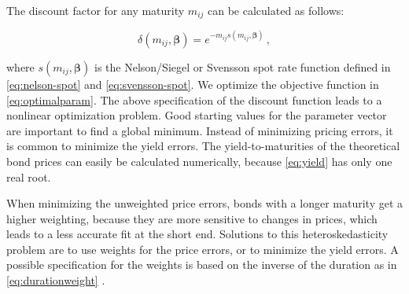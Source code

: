 The discount factor for any maturity $m_{ij}$ can be calculated as follows:

\begin{displaymath}
\delta(m_{ij}, \bm{\beta})=e^{-m_{ij}s(m_{ij},\bm{\beta})}\,,
\end{displaymath}

where $s(m_{ij},\bm{\beta})$ is the Nelson/Siegel or Svensson spot rate function defined in \eqref{eq:nelson-spot} and \eqref{eq:svensson-spot}. We optimize the objective function in \eqref{eq:optimalparam}. The above specification of the discount function leads to a nonlinear optimization problem. Good starting values for the parameter vector are important to find a global minimum. Instead of minimizing pricing errors, it is common to minimize the yield errors. The yield-to-maturities of the theoretical bond prices can easily be calculated numerically, because \eqref{eq:yield} has only one real root. 

When minimizing the unweighted price errors, bonds with a longer maturity get a higher weighting, because they are more sensitive to changes in prices, which leads to a less accurate fit at the short end. Solutions to this heteroskedasticity problem are to use weights for the price errors, or to minimize the yield errors. A possible specification for the weights is based on the inverse of the duration as in \eqref{eq:durationweight} \citep[see][]{Bliss1997}.


